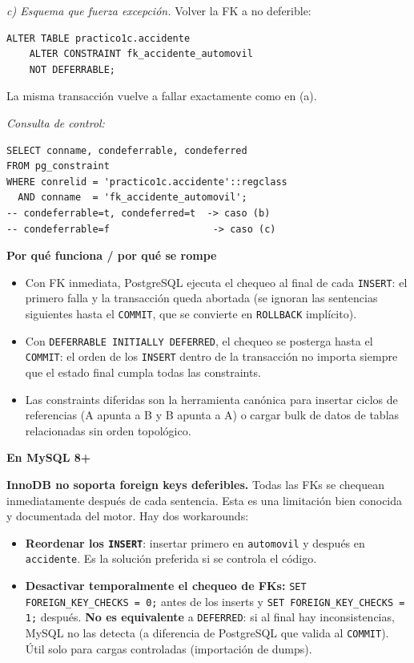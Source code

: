 \documentclass[11pt,a4paper]{article}
\newcommand{\itemcabecera}[1]{\noindent\textbf{#1}\par\medskip}
\newcommand{\bloquePorque}{\itemcabecera{Por qu\'e funciona / por qu\'e se rompe}}
\newcommand{\bloqueMySQL}{\itemcabecera{En MySQL 8+}}
\begin{document}
\textit{c) Esquema que fuerza excepción.} Volver la FK a no deferible:

\begin{lstlisting}
ALTER TABLE practico1c.accidente
    ALTER CONSTRAINT fk_accidente_automovil
    NOT DEFERRABLE;
\end{lstlisting}

La misma transacción vuelve a fallar exactamente como en (a).

\textit{Consulta de control:}

\begin{lstlisting}
SELECT conname, condeferrable, condeferred
FROM pg_constraint
WHERE conrelid = 'practico1c.accidente'::regclass
  AND conname  = 'fk_accidente_automovil';
-- condeferrable=t, condeferred=t  -> caso (b)
-- condeferrable=f                  -> caso (c)
\end{lstlisting}

\bloquePorque

\begin{itemize}
    \item Con FK inmediata, PostgreSQL ejecuta el chequeo al final de cada \texttt{INSERT}: el primero falla y la transacción queda abortada (se ignoran las sentencias siguientes hasta el \texttt{COMMIT}, que se convierte en \texttt{ROLLBACK} implícito).
    \item Con \texttt{DEFERRABLE INITIALLY DEFERRED}, el chequeo se posterga hasta el \texttt{COMMIT}: el orden de los \texttt{INSERT} dentro de la transacción no importa siempre que el estado final cumpla todas las constraints.
    \item Las constraints diferidas son la herramienta canónica para insertar ciclos de referencias (A apunta a B y B apunta a A) o cargar bulk de datos de tablas relacionadas sin orden topológico.
\end{itemize}

\bloqueMySQL

\textbf{InnoDB no soporta foreign keys deferibles.} Todas las FKs se chequean inmediatamente después de cada sentencia. Esta es una limitación bien conocida y documentada del motor. Hay dos workarounds:

\begin{itemize}
    \item \textbf{Reordenar los \texttt{INSERT}}: insertar primero en \texttt{automovil} y después en \texttt{accidente}. Es la solución preferida si se controla el código.
    \item \textbf{Desactivar temporalmente el chequeo de FKs:} \texttt{SET FOREIGN\_KEY\_CHECKS = 0;} antes de los inserts y \texttt{SET FOREIGN\_KEY\_CHECKS = 1;} después. \textbf{No es equivalente} a \texttt{DEFERRED}: si al final hay inconsistencias, MySQL no las detecta (a diferencia de PostgreSQL que valida al \texttt{COMMIT}). Útil solo para cargas controladas (importación de dumps).
\end{itemize}
\end{document}
